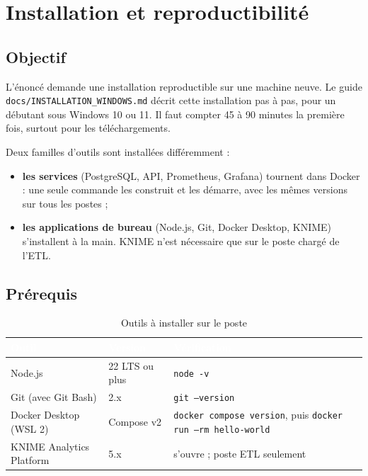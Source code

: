 \chapter{Installation et reproductibilité}\label{chap:installation}

\section{Objectif}
L'énoncé demande une installation reproductible sur une machine neuve. Le guide
\texttt{docs/INSTALLATION\_WINDOWS.md} décrit cette installation pas à pas, pour un débutant sous
Windows 10 ou 11. Il faut compter 45 à 90 minutes la première fois, surtout pour les téléchargements.

Deux familles d'outils sont installées différemment :
\begin{itemize}
  \item \textbf{les services} (PostgreSQL, API, Prometheus, Grafana) tournent dans Docker : une seule
        commande les construit et les démarre, avec les mêmes versions sur tous les postes ;
  \item \textbf{les applications de bureau} (Node.js, Git, Docker Desktop, KNIME) s'installent à la main.
        KNIME n'est nécessaire que sur le poste chargé de l'ETL.
\end{itemize}

\section{Prérequis}
\begin{table}[H]
\centering\small
\caption{Outils à installer sur le poste}
\label{tab:prerequis}
\begin{tabularx}{\linewidth}{|l|l|X|}
\hline
\rowcolor{bluedark}\textcolor{white}{\textbf{Outil}} & \textcolor{white}{\textbf{Version}} & \textcolor{white}{\textbf{Vérification}} \\
\hline
Node.js & 22 LTS ou plus & \texttt{node -v} \\
\hline
Git (avec Git Bash) & 2.x & \texttt{git --version} \\
\hline
Docker Desktop (WSL 2) & Compose v2 & \texttt{docker compose version}, puis \texttt{docker run --rm hello-world} \\
\hline
KNIME Analytics Platform & 5.x & s'ouvre ; poste ETL seulement \\
\hline
\end{tabularx}
\end{table}

